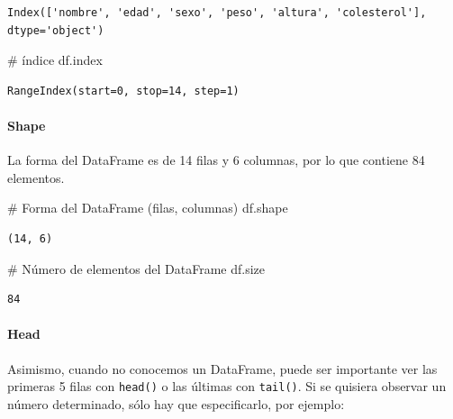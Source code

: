 \documentclass[
  letterpaper,
  DIV=11,
  numbers=noendperiod]{scrreprt}
\let\oldparagraph\paragraph
\renewcommand{\paragraph}[1]{\oldparagraph{#1}\mbox{}}
\newenvironment{Shaded}{\begin{snugshade}}{\end{snugshade}}
\newcommand{\CommentTok}[1]{\textcolor[rgb]{0.37,0.37,0.37}{#1}}
\newcommand{\NormalTok}[1]{\textcolor[rgb]{0.00,0.23,0.31}{#1}}
\begin{document}
\begin{verbatim}
Index(['nombre', 'edad', 'sexo', 'peso', 'altura', 'colesterol'], dtype='object')
\end{verbatim}

\begin{Shaded}
\begin{Highlighting}[]
\CommentTok{\# índice}
\NormalTok{df.index}
\end{Highlighting}
\end{Shaded}

\begin{verbatim}
RangeIndex(start=0, stop=14, step=1)
\end{verbatim}

\paragraph{Shape}\label{shape}

La forma del DataFrame es de 14 filas y 6 columnas, por lo que contiene
84 elementos.

\begin{Shaded}
\begin{Highlighting}[]
\CommentTok{\# Forma del DataFrame (filas, columnas)}
\NormalTok{df.shape}
\end{Highlighting}
\end{Shaded}

\begin{verbatim}
(14, 6)
\end{verbatim}

\begin{Shaded}
\begin{Highlighting}[]
\CommentTok{\# Número de elementos del DataFrame}
\NormalTok{df.size}
\end{Highlighting}
\end{Shaded}

\begin{verbatim}
84
\end{verbatim}

\paragraph{Head}\label{head}

Asimismo, cuando no conocemos un DataFrame, puede ser importante ver las
primeras 5 filas con \texttt{head()} o las últimas con \texttt{tail()}.
Si se quisiera observar un número determinado, sólo hay que
especificarlo, por ejemplo:
\end{document}
